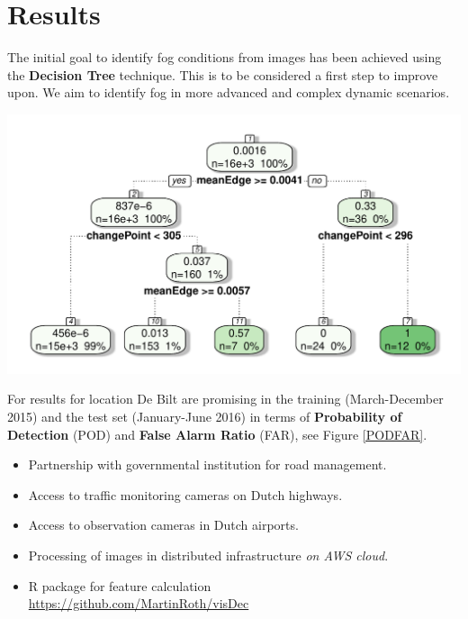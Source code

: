 \documentclass{article}
\begin{document}
\section*{Results}
The initial goal to identify fog conditions from images has been achieved using 
the \textbf{Decision Tree} technique. 
This is to be considered a first step to improve upon. 
We aim to identify fog in more advanced and complex dynamic scenarios.

\begin{minipage}[b]{\columnwidth}
	\begin{center}
	\includegraphics[width=0.9\columnwidth]{ClassificationTree-1}
	\label{figTree}
	\end{center}
\end{minipage}

For results for location De Bilt are promising in the training 
(March-December 2015) and the test set (January-June 2016) in terms of 
\textbf{Probability of Detection} (POD) and \textbf{False Alarm Ratio} (FAR),
see Figure \ref{PODFAR}.

\begin{tcolorbox}[colback=red!5!white,colframe=red!75!black,title=Overall Project Results]
\begin{itemize}
\item{Partnership with governmental institution for road management.}
\item{Access to traffic monitoring cameras on Dutch highways.}
\item{Access to observation cameras in Dutch airports.}
\item{Processing of images in distributed infrastructure \emph{on AWS cloud}.}
\item{R package for feature calculation\\ \url{https://github.com/MartinRoth/visDec}}
\end{itemize}
\end{tcolorbox}
\end{document}
